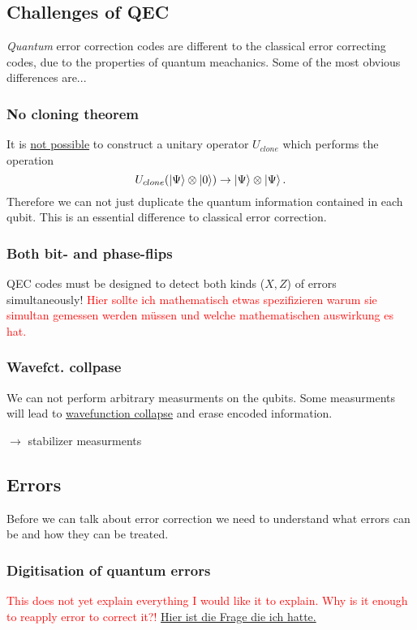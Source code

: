\subsection{Challenges of QEC}
\textit{Quantum} error correction codes are different to the classical error correcting codes, 
due to the properties of quantum meachanics. 
Some of the most obvious differences are...


\subsubsection{No cloning theorem}
It is \hyperref[sec:basic.math.no_cloning_theorem]{not possible} to construct a unitary operator $U_{clone}$ 
which performs the operation
\begin{equation}
    U_{clone}(\ket{\Psi} \otimes \ket{0}) \rightarrow \ket{\Psi} \otimes\ket{\Psi}.
\end{equation}
Therefore we can not just duplicate the quantum information contained in each qubit. 
This is an essential difference to classical error correction. \cite{QECintro}


\subsubsection{Both bit- and phase-flips}
QEC codes must be designed to detect both kinds ($X,Z$) of errors simultaneously! \cite{QECintro}
\textcolor{red}{
    Hier sollte ich mathematisch etwas spezifizieren warum sie simultan gemessen werden müssen 
    und welche mathematischen auswirkung es hat.}


\subsubsection{Wavefct. collpase}
We can not perform arbitrary measurments on the qubits. 
Some measurments will lead to \hyperref[sec:basic.math.wavefct_collpase]{wavefunction collapse} 
and erase encoded information. \cite{QECintro}

$\rightarrow$ stabilizer measurments



\subsection{Errors}
Before we can talk about error correction we need to understand what errors can be and how they can be treated.


\subsubsection{Digitisation of quantum errors}
\textcolor{red}{
    This does not yet explain everything I would like it to explain. 
    Why is it enough to reapply error to correct it?!} 
\href{https://quantumcomputing.stackexchange.com/questions/35211/digitization-of-errors-in-qec}{Hier ist die Frage die ich hatte.}

